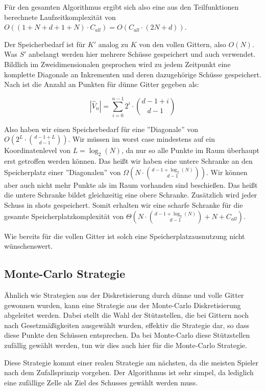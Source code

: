 \documentclass[a4paper,12pt]{llncs}
\numberwithin{equation}{section}
\begin{document}
Für den gesamten Algorithmus ergibt sich also eine aus den Teilfunktionen berechnete Laufzeitkomplexität von $O((1+N+d+1+N)\cdot C_{all}) = O(C_{all}\cdot(2N+d))$.

Der Speicherbedarf ist für $K'$ analog zu $K$ von den vollen Gittern, also $O(N)$. Was $S'$ anbelangt werden hier mehrere Schüsse gespeichert und auch verwendet. Bildlich im Zweidimensionalen gesprochen wird zu jedem Zeitpunkt eine komplette Diagonale an Inkrementen und deren dazugehörige Schüsse gespeichert. Nach \cite{GG08} ist die Anzahl an Punkten für dünne Gitter gegeben als:

\begin{equation}
\left|\hat{V}_n\right| = \sum_{i=0}^{n-1} 2^i \cdot \binom{d-1+i}{d-1}
\end{equation}

Also haben wir einen Speicherbedarf für eine ''Diagonale'' von $O\left(2^L \cdot \binom{d-1+L}{d-1}\right)$. Wir müssen im worst case mindestens auf ein Koordinatenlevel von $L=\log_2(N)$, da nur so alle Punkte im Raum überhaupt erst getroffen werden können. Das heißt wir haben eine untere Schranke an den Speicherplatz einer ''Diagonalen'' von $\Omega\left(N \cdot \binom{d-1+\log_2(N)}{d-1}\right)$. Wir können aber auch nicht mehr Punkte als im Raum vorhanden sind beschießen. Das heißt die untere Schranke bildet gleichzeitig eine obere Schranke. Zusätzlich wird jeder Schuss in shots gespeichert. Somit erhalten wir eine scharfe Schranke für die gesamte Speicherplatzkomplexität von $\Theta\left(N \cdot \binom{d-1+\log_2(N)}{d-1} + N + C_{all}\right)$.

Wie bereits für die vollen Gitter ist solch eine Speicherplatzausnutzung nicht wünschenswert.


\subsection{Monte-Carlo Strategie}

Ähnlich wie Strategien aus der Diskretisierung durch dünne und volle Gitter gewonnen wurden, kann eine Strategie aus der Monte-Carlo Diskretisierung abgeleitet werden. Dabei stellt die Wahl der Stützstellen, die bei Gittern noch nach Gesetzmäßigkeiten ausgewählt wurden, effektiv die Strategie dar, so dass diese Punkte den Schüssen entsprechen. Da bei Monte-Carlo diese Stützstellen zufällig gewählt werden, tun wir dies auch hier für die Monte-Carlo Strategie. 

Diese Strategie kommt einer realen Strategie am nächsten, da die meisten Spieler nach dem Zufallsprinzip vorgehen. Der Algorithmus ist sehr simpel, da lediglich eine zufällige Zelle als Ziel des Schusses gewählt werden muss.
\end{document}
